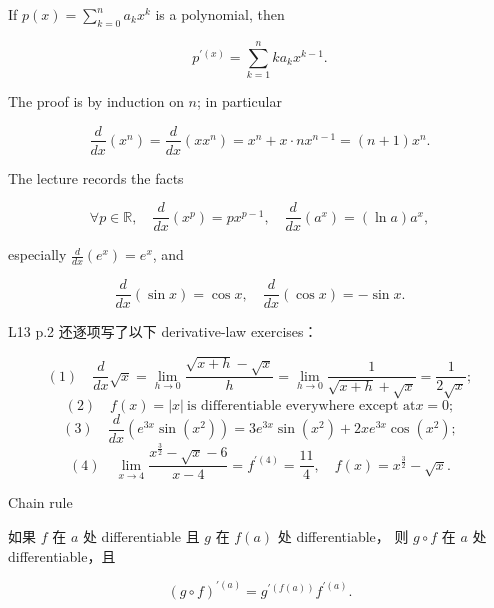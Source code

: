 \begin{example}

If \(p(x) = \sum_{k = 0}^{n}a_{k}x^{k}\) is a polynomial, then

\[p^{'{(x)}} = \sum\limits_{k = 1}^{n}ka_{k}x^{k - 1}.\]

The proof is by induction on \(n\); in particular

\[\frac{d}{dx}\left( x^{n} \right) = \frac{d}{dx}\left( {xx^{n}} \right) = x^{n} + x \cdot nx^{n - 1} = \left( {n + 1} \right)x^{n}.\]

The lecture records the facts

\[\forall p \in \mathbb{R},\quad\frac{d}{dx}\left( x^{p} \right) = px^{p - 1},\quad\frac{d}{dx}\left( a^{x} \right) = \left( {\ln a} \right)a^{x},\]

especially \(\frac{d}{dx}\left( e^{x} \right) = e^{x}\), and

\[\frac{d}{dx}\left( {\sin x} \right) = \cos x,\quad\frac{d}{dx}\left( {\cos x} \right) = - \sin x.\]

L13 p.2 还逐项写了以下 derivative-law exercises：

\[(1)\quad\frac{d}{dx}\sqrt{x} = \lim\limits_{h\rightarrow 0}\frac{\sqrt{x + h} - \sqrt{x}}{h} = \lim\limits_{h\rightarrow 0}\frac{1}{\sqrt{x + h} + \sqrt{x}} = \frac{1}{2\sqrt{x}};\]\[(2)\quad f(x) = |x|\ \text{is differentiable everywhere except at}x = 0;\]\[(3)\quad\frac{d}{dx}\left( {e^{3x}\sin\left( x^{2} \right)} \right) = 3e^{3x}\sin\left( x^{2} \right) + 2xe^{3x}\cos\left( x^{2} \right);\]\[(4)\quad\lim\limits_{x\rightarrow 4}\frac{x^{\frac{3}{2}} - \sqrt{x} - 6}{x - 4} = f^{'{(4)}} = \frac{11}{4},\quad f(x) = x^{\frac{3}{2}} - \sqrt{x}.\]

\end{example}

\begin{theorem}{Chain rule}

如果 \(f\) 在 \(a\) 处 differentiable 且 \(g\) 在 \(f(a)\) 处 differentiable， 则 \(g \circ f\) 在 \(a\) 处 differentiable，且

\[\left( {g \circ f} \right)^{'{(a)}} = g^{'{({f{(a)}})}}f^{'{(a)}}.\]

\end{theorem}


